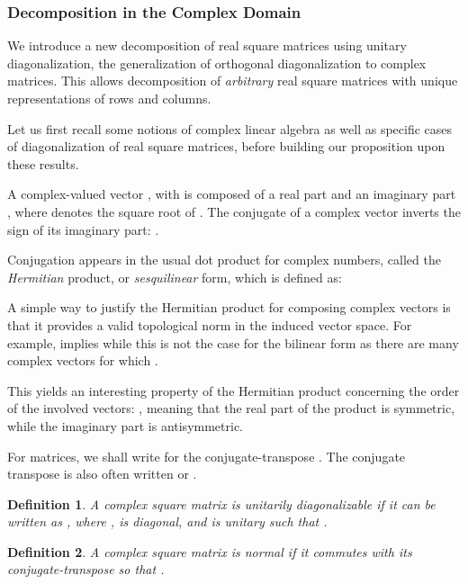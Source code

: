 \documentclass[twoside,11pt]{article}
\newtheorem{defn}{Definition}
\begin{document}
\subsubsection{Decomposition in the Complex Domain}

We introduce a new decomposition of real square matrices using unitary
diagonalization, the generalization of orthogonal diagonalization
to complex matrices. This allows decomposition of \emph{arbitrary} real square matrices
with unique representations of rows and columns.

Let us first recall some notions of complex linear algebra as well as
specific cases of diagonalization of real square matrices, before building
our proposition upon these results.



A complex-valued vector , with  is composed 
of a real part
 and an imaginary part 
, where  denotes the square root of .
The conjugate   of a complex vector inverts the sign
of its imaginary part: .

Conjugation appears in the usual dot product for complex numbers,
called the \emph{Hermitian} product, or \emph{sesquilinear} form, which is defined as:


A simple way to justify the Hermitian product for composing complex vectors is that it provides a valid topological norm in the induced vector space. For example,  implies  while this is not the case for the bilinear form  as there are many complex vectors  for which . 

This yields an interesting property of the Hermitian product concerning the
order of the involved vectors: , 
meaning that the real part of the product is symmetric,
while the imaginary part is antisymmetric.


For matrices, we shall write  for the conjugate-transpose . The conjugate transpose is also often written  or .


\begin{defn}
A complex square matrix  is unitarily diagonalizable if it can be
written as , where ,  is diagonal, and  is unitary such that .
\end{defn}



\begin{defn}
A complex square matrix  is normal if it commutes with its
conjugate-transpose so that .
\end{defn}
\end{document}
